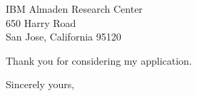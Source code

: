 \documentclass{letter}
\begin{document}
\begin{letter}{IBM Almaden Research Center \\
650 Harry Road\\
San Jose, California 95120}

 
\noindent Thank you for considering my application.

 
\closing{Sincerely yours,}
 
  

\end{letter}
 
\end{document}
